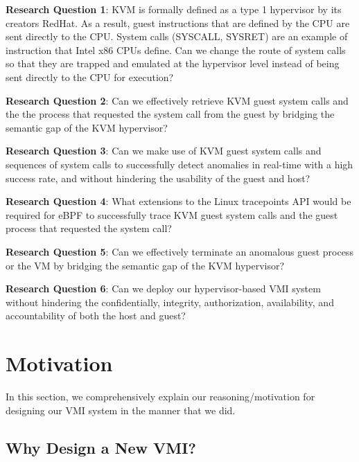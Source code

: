 \documentclass{report}
\begin{document}
\begin{spacing}{1.5}
{\large
\noindent \textbf{Research Question 1}: KVM is formally defined as a type 1 hypervisor by its creators RedHat. As a result, guest instructions that are defined by the CPU are sent directly to the CPU. System calls (SYSCALL, SYSRET) are an example of instruction that Intel x86 CPUs define. Can we change the route of system calls so that they are trapped and emulated at the hypervisor level instead of being sent directly to the CPU for execution?
\newline
}

{\large
\noindent \textbf{Research Question 2}: Can we effectively retrieve KVM guest system calls and the the process that requested the system call from the guest by bridging the semantic gap of the KVM hypervisor?
\newline
}


{\large
\noindent \textbf{Research Question 3}: Can we make use of KVM guest system calls and sequences of system calls to successfully detect anomalies in real-time with a high success rate, and without hindering the usability of the guest and host?
\newline
}


{\large
\noindent \textbf{Research Question 4}: What extensions to the Linux tracepoints API would be required for eBPF to successfully trace KVM guest system calls and the guest process that requested the system call?
\newline
}

{\large
\noindent \textbf{Research Question 5}: Can we effectively terminate an anomalous guest process or the VM by bridging the semantic gap of the KVM hypervisor?
\newline
}

{\large
\noindent \textbf{Research Question 6}: Can we deploy our hypervisor-based VMI system without hindering the confidentially, integrity, authorization, availability, and accountability of both the host and guest?  
\newline
}


\section{Motivation}

{\large 
In this section, we comprehensively explain our reasoning/motivation for designing our VMI system in the manner that we did.
}
 

\subsection{Why Design a New VMI?}


\end{spacing}
\end{document}
